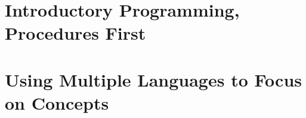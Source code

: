 \section{Introductory Programming, Procedures First} %
\label{sec:introductory_programming_procedures_first}


\section{Using Multiple Languages to Focus on Concepts} %
\label{sec:using_multiple_languages_to_focus_on_concepts}


